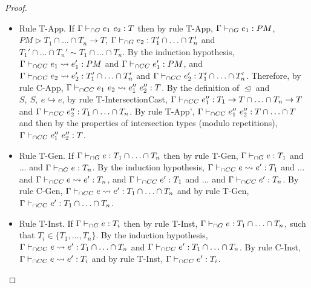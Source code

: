 \documentclass[a4paper]{article}
\begin{document}
\begin{proof}
\begin{itemize}
    \item Rule T-App.
    If $\Gamma \vdash_{\cap G} e_1\ e_2 : T$ then by rule T-App, $\Gamma \vdash_{\cap G} e_1 : PM$, $PM \rhd T_1 \cap \ldots \cap T_n \rightarrow T$, $\Gamma \vdash_{\cap G} e_2 : T_1' \cap \ldots \cap T_n'$ and $T_1' \cap \ldots \cap T_n' \sim T_1 \cap \ldots \cap T_n$.
    By the induction hypothesis, $\Gamma \vdash_{\cap CC} e_1 \leadsto e_1' : PM$ and $\Gamma \vdash_{\cap CC} e_1' : PM$, and $\Gamma \vdash_{\cap CC} e_2 \leadsto e_2' : T_1' \cap \ldots \cap T_n'$ and $\Gamma \vdash_{\cap CC} e_2' : T_1' \cap \ldots \cap T_n'$.
    Therefore, by rule C-App, $\Gamma \vdash_{\cap CC} e_1\ e_2 \leadsto e_1''\ e_2'' : T$.
    By the definition of $\trianglelefteq$ and $S,\ S,\ e \hookrightarrow e$, by rule T-IntersectionCast, $\Gamma \vdash_{\cap CC} e_1'' : T_1 \rightarrow T \cap \ldots \cap T_n \rightarrow T$ and $\Gamma \vdash_{\cap CC} e_2'' : T_1 \cap \ldots \cap T_n$.
    By rule T-App', $\Gamma \vdash_{\cap CC} e_1''\ e_2'' : T \cap \ldots \cap T$ and then by the properties of intersection types (modulo repetitions), $\Gamma \vdash_{\cap CC} e_1''\ e_2'' : T$.
    \item Rule T-Gen.
    If $\Gamma \vdash_{\cap G} e : T_1 \cap \ldots \cap T_n$ then by rule T-Gen, $\Gamma \vdash_{\cap G} e : T_1$ and ... and $\Gamma \vdash_{\cap G} e : T_n$.
    By the induction hypothesis, $\Gamma \vdash_{\cap CC} e \leadsto e' : T_1$ and ... and $\Gamma \vdash_{\cap CC} e \leadsto e' : T_n$, and $\Gamma \vdash_{\cap CC} e' : T_1$ and ... and $\Gamma \vdash_{\cap CC} e' : T_n$.
    By rule C-Gen, $\Gamma \vdash_{\cap CC} e \leadsto e' : T_1 \cap \ldots \cap T_n$ and by rule T-Gen, $\Gamma \vdash_{\cap CC} e' : T_1 \cap \ldots \cap T_n$.
    \item Rule T-Inst.
    If $\Gamma \vdash_{\cap G} e : T_i$ then by rule T-Inst, $\Gamma \vdash_{\cap G} e : T_1 \cap \ldots \cap T_n$, such that $T_i \in \{T_1, \ldots, T_n\}$.
    By the induction hypothesis, $\Gamma \vdash_{\cap CC} e \leadsto e' : T_1 \cap \ldots \cap T_n$ and $\Gamma \vdash_{\cap CC} e' : T_1 \cap \ldots \cap T_n$.
    By rule C-Inst, $\Gamma \vdash_{\cap CC} e \leadsto e' : T_i$ and by rule T-Inst, $\Gamma \vdash_{\cap CC} e' : T_i$.
\end{itemize}
\end{proof}
\end{document}

